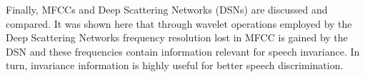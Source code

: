 Finally, MFCCs and Deep Scattering Networks (DSNs) are discussed and compared. It was shown here that through wavelet operations employed by the Deep Scattering Networks frequency resolution lost in MFCC is gained by the DSN and these frequencies contain information relevant for speech invariance. In turn, invariance information is highly useful for better speech discrimination.